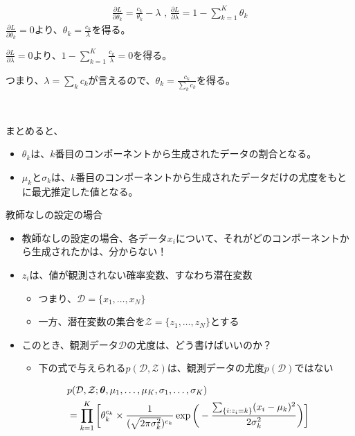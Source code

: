 \documentclass[aspectratio=169,unicode,dvipdfmx,14pt]{beamer}
\begin{document}
\begin{frame}
\FontMath
\begin{align}
\frac{\partial L}{\partial \theta_k} = \frac{c_k}{\theta_k} - \lambda \mbox{ , \ }
\frac{\partial L}{\partial \lambda} = 1 - \sum_{k=1}^K \theta_k
\end{align}
$\frac{\partial L}{\partial \theta_k} = 0$より、$\theta_k = \frac{c_k}{\lambda}$を得る。

$\frac{\partial L}{\partial \lambda} = 0$より、$1 - \sum_{k=1}^K \frac{c_k}{\lambda} = 0$を得る。

つまり、$\lambda = \sum_k c_k$が言えるので、$\theta_k = \frac{c_k}{\sum_k c_k}$を得る。

\

まとめると、
\begin{itemize}
\item $\theta_k$は、$k$番目のコンポーネントから生成されたデータの割合となる。
\item $\mu_k$と$\sigma_k$は、$k$番目のコンポーネントから生成されたデータだけの尤度をもとに最尤推定した値となる。
\end{itemize}
\end{frame}

\begin{frame}{教師なしの設定の場合}
\begin{itemize}
\item 教師なしの設定の場合、各データ$x_i$について、それがどのコンポーネントから生成されたかは、分からない！
\item $z_i$は、値が観測されない確率変数、すなわち潜在変数
\begin{itemize}
\item つまり、$\mathcal{D} = \{ x_1, \ldots, x_N \}$
\item 一方、潜在変数の集合を$\mathcal{Z} = \{ z_1, \ldots, z_N \}$とする
\end{itemize}
\item このとき、観測データ$\mathcal{D}$の尤度は、どう書けばいいのか？
\begin{itemize}
\item 下の式で与えられる$p(\mathcal{D}, \mathcal{Z})$は、観測データの尤度$p(\mathcal{D})$ではない
\end{itemize}
\vspace{-.1in}
\begin{align}
& p(\mathcal{D}, \mathcal{Z};\bm{\theta},\mu_1,\ldots,\mu_K,\sigma_1,\ldots,\sigma_K)
\notag \\ &
= \prod_{k=1}^K \bigg[ \theta_k^{c_k} \times \frac{1}{ (\sqrt{2\pi\sigma_k^2} )^{c_k}} 
\exp\bigg( - \frac{ \sum_{ \{ i : z_i = k \} } (x_i - \mu_k)^2 }{2\sigma_k^2} \bigg) \bigg]
\end{align}
\end{itemize}
\end{frame}
\end{document}
